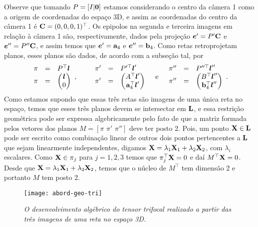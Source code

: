 Observe que tomando $P=[I|{\bf 0}]$ estamos considerando o centro da câmera 1 como a origem de coordenadas do espaço 3D, e assim as coordenadas do centro da câmera 1 é ${\bf C}=(0,0,0,1)^\top$. Os epipolos na segunda e terceira imagens em relação à câmera 1 são, respectivamente, dados pela projeção $\boldsymbol{e}'=P'{\bf C}$ e $\boldsymbol{e}''=P''{\bf C}$, e assim temos que $\boldsymbol{e}'={\bf a}_4$ e $\boldsymbol{e}''={\bf b}_4$. Como retas retroprojetam planos, esses planos são dados, de acordo com a subseção tal, por
\begin{equation*}
\begin{array}{rcl}
\pi&=&P^\top\boldsymbol{l}\\
\pi&=&
\begin{pmatrix}
\boldsymbol{l}\\
0
\end{pmatrix}
\end{array},\qquad
\begin{array}{rcl}
\pi'&=&P'^\top\boldsymbol{l}'\\
\pi'&=&
\begin{pmatrix}
A^\top\boldsymbol{l}'\\
{\bf a}^\top_4\boldsymbol{l}'
\end{pmatrix}
\end{array}\quad\text{e}\quad
\begin{array}{rcl}
\pi''&=&P''^\top\boldsymbol{l}''\\
\pi''&=&
\begin{pmatrix}
B^\top\boldsymbol{l}''\\
{\bf b}^\top_4\boldsymbol{l}''
\end{pmatrix}
\end{array}.
\end{equation*}
Como estamos supondo que essas três retas são imagens de uma única reta no espaço, temos que esses três planos devem se intersectar em ${\bf L}$, e essa restrição geométrica pode ser expressa algebricamente pelo fato de que a matriz formada pelos vetores dos planos $M=[\pi \,\,\pi'\,\,\pi'']$ deve ter posto 2. Pois, um ponto $\mathbf{X}\in{\bf L}$ pode ser escrito como combinação linear de outros dois pontos pertencentes a ${\bf L}$ que sejam linearmente independentes, digamos $\mathbf{X}=\lambda_1\mathbf{X}_1+\lambda_2\mathbf{X}_2$, com $\lambda_i$ escalares. Como $\mathbf{X}\in\pi_j$ para $j=1,2,3$ temos que $\pi_j^\top\mathbf{X}=0$ e daí $M^\top\mathbf{X}=0$. Desde que $\mathbf{X}=\lambda_1\mathbf{X}_1+\lambda_2\mathbf{X}_2$, temos que o núcleo de $M^\top$ tem dimensão 2 e portanto $M$ tem posto 2.
\begin{figure}[!htb]
\centering
\texttt{[image: abord-geo-tri]}
\caption{{\it O desenvolvimento algébrico do tensor trifocal realizado a partir das três imagens de uma reta no espaço 3D.}}
\label{fig.abord-geo-tri}
\end{figure}
